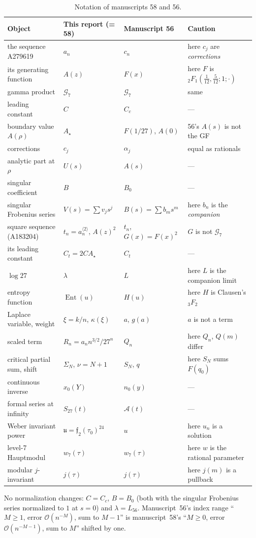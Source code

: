 \documentclass[11pt,letterpaper]{article}
\theoremstyle{remark}\newtheorem{remark}[theorem]{Remark}
\newcommand{\G}{\mathcal G_7}\newcommand{\Ast}{A_\star}
\newcommand{\bigO}{\mathcal O}\newcommand{\Ct}{C_{t}}
\newcommand{\Ent}{\operatorname{Ent}}
\newcounter{l7gtrsavedeq}
\begin{document}
\begin{center}\small
\begin{longtable}{p{}p{}p{}p{}}
\caption{Notation of manuscripts 58 and 56.}\label{l7g:tab:notation}\\
\toprule
Object & This report (=\,58) & Manuscript 56 & Caution\\\midrule\endhead
the sequence A279619 & $a_n$ & $c_n$ & here $c_j$ are \emph{corrections}\\
its generating function & $A(z)$ & $F(x)$ & here $F$ is ${}_2F_1(\tfrac1{12},\tfrac5{12};1;\cdot)$\\
gamma product & $\G$ & $\G$ & same\\
leading constant & $C$ & $C_c$ & ---\\
boundary value $A(\rho)$ & $\Ast$ & $F(1/27)$, $A(0)$ & 56's $A(s)$ is not the GF\\
corrections & $c_j$ & $\alpha_j$ & equal as rationals\\
analytic part at $\rho$ & $U(s)$ & $A(s)$ & ---\\
singular coefficient & $B$ & $B_0$ & ---\\
singular Frobenius series & $V(s)=\sum v_js^j$ & $B(s)=\sum b_ms^m$ & here $b_n$ is the \emph{companion}\\
square sequence (A183204) & $t_n=a_n^{\langle2\rangle}$, $A(z)^2$ & $t_n$, $G(x)=F(x)^2$ & $G$ is not $\G$\\
its leading constant & $\Ct=2C\Ast$ & $C_t$ & ---\\
$\log27$ & $\lambda$ & $L$ & here $L$ is the companion limit\\
entropy function & $\Ent(u)$ & $H(u)$ & here $H$ is Clausen's ${}_3F_2$\\
Laplace variable, weight & $\xi=k/n$, $\kappa(\xi)$ & $a$, $g(a)$ & $a$ is not a term\\
scaled term & $R_n=a_nn^{3/2}/27^n$ & $Q_n$ & here $Q_n$, $Q(m)$ differ\\
critical partial sum, shift & $\Sigma_N$, $\nu=N+1$ & $S_N$, $q$ & here $S_N$ sums $F(q_0)$\\
continuous inverse & $x_0(Y)$ & $n_0(y)$ & ---\\
formal series at infinity & $S_{27}(t)$ & $\mathcal A(t)$ & ---\\
Weber invariant power & $\mathfrak u=\mathfrak f_2(\tau_0)^{24}$ & $u$ & here $u_n$ is a solution\\
level-7 Hauptmodul & $w_7(\tau)$ & $w_7(\tau)$ & here $w$ is the rational parameter\\
modular $j$-invariant & $j(\tau)$ & $j(\tau)$ & here $j(m)$ is a pullback\\
\bottomrule
\end{longtable}
\end{center}
No normalization changes: $C=C_c$, $B=B_0$ (both with the singular
Frobenius series normalized to $1$ at $s=0$) and $\lambda=L_{56}$.
Manuscript~56's index range ``$M\ge1$, error $\bigO(n^{-M})$, sum to
$M-1$'' is manuscript~58's ``$M\ge0$, error $\bigO(n^{-M-1})$, sum to
$M$'' shifted by one.
\end{document}
